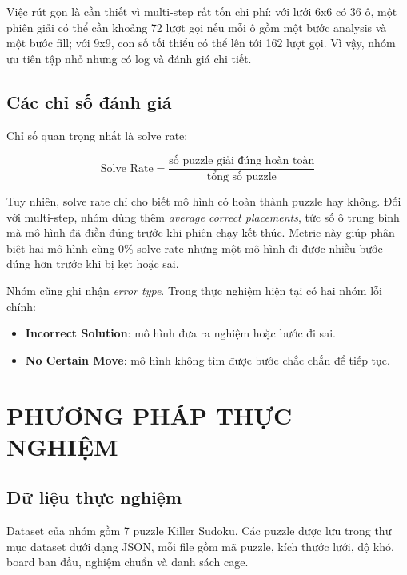 \documentclass[12pt,a4paper,oneside]{report}
\newlength{\manualparindent}
\newcommand{\manualindent}{\hspace*{\manualparindent}}
\begin{document}
\manualindent%
Việc rút gọn là cần thiết vì multi-step rất tốn chi phí: với lưới 6x6 có 36 ô, một phiên giải có thể cần khoảng 72 lượt gọi nếu mỗi ô gồm một bước analysis và một bước fill; với 9x9, con số tối thiểu có thể lên tới 162 lượt gọi. Vì vậy, nhóm ưu tiên tập nhỏ nhưng có log và đánh giá chi tiết.

\section{Các chỉ số đánh giá}

Chỉ số quan trọng nhất là solve rate:

\[
  \text{Solve Rate} = \frac{\text{số puzzle giải đúng hoàn toàn}}{\text{tổng số puzzle}}
\]

Tuy nhiên, solve rate chỉ cho biết mô hình có hoàn thành puzzle hay không. Đối với multi-step, nhóm dùng thêm \textit{average correct placements}, tức số ô trung bình mà mô hình đã điền đúng trước khi phiên chạy kết thúc. Metric này giúp phân biệt hai mô hình cùng 0\% solve rate nhưng một mô hình đi được nhiều bước đúng hơn trước khi bị kẹt hoặc sai.

Nhóm cũng ghi nhận \textit{error type}. Trong thực nghiệm hiện tại có hai nhóm lỗi chính:

\begin{itemize}
  \item \textbf{Incorrect Solution}: mô hình đưa ra nghiệm hoặc bước đi sai.
  \item \textbf{No Certain Move}: mô hình không tìm được bước chắc chắn để tiếp tục.
\end{itemize}

\chapter{PHƯƠNG PHÁP THỰC NGHIỆM}

\section{Dữ liệu thực nghiệm}

\manualindent%
Dataset của nhóm gồm 7 puzzle Killer Sudoku. Các puzzle được lưu trong thư mục dataset dưới dạng JSON, mỗi file gồm mã puzzle, kích thước lưới, độ khó, board ban đầu, nghiệm chuẩn và danh sách cage.
\end{document}
